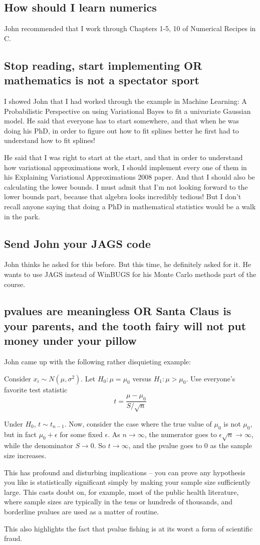 \documentclass{amsart}
\begin{document}
\subsection{How should I learn numerics}
John recommended that I work through Chapters 1-5, 10 of Numerical Recipes
in C.

\subsection{Stop reading, start implementing OR mathematics is not a spectator sport}
I showed John that I had worked through the example in Machine Learning: A
Probabilistic Perspective on using Variational Bayes to fit a univariate
Gaussian model. He said that everyone has to start somewhere, and that when
he was doing his PhD, in order to figure out how to fit splines better he first
had to understand how to fit splines!

He said that I was right to start at the start, and that in order to understand
how variational approximations work, I should implement every one of them in
his Explaining Variational Approximations 2008 paper. And that I should also
be calculating the lower bounds. I must admit that I'm not looking forward to
the lower bounds part, because that algebra looks incredibly tedious! But I don't
recall anyone saying that doing a PhD in mathematical statistics would be a
walk in the park.

\subsection{Send John your JAGS code}
John thinks he asked for this before. But this time, he definitely asked for it.
He wants to use JAGS instead of WinBUGS for his Monte Carlo methods part of the
course.

\subsection{pvalues are meaningless OR Santa Claus is your parents, and the tooth fairy will not put money under your pillow}
John came up with the following rather disquieting example:

Consider $x_i \sim N(\mu, \sigma^2)$. Let $H_0: \mu = \mu_0$ versus
$H_1: \mu > \mu_0$. Use everyone's favorite test statistic
\[
t = \frac{\mu - \mu_0}{S/\sqrt{n}}
\]

Under $H_0$, $t \sim t_{n-1}$. Now, consider the case where the true value of 
$\mu_0$ is not $\mu_0$, but in fact $\mu_0 + \epsilon$ for some fixed $\epsilon$. 
As $n \to \infty$, the numerator goes to $\epsilon \sqrt{n} \to \infty$, while the
denominator $S \to 0$. So $t \to \infty$, and the pvalue goes to $0$ as the sample 
size increases.

This has profound and disturbing implications -- you can prove any hypothesis you 
like is statistically significant simply by making your sample size sufficiently 
large. This casts doubt on, for example, most of the public health literature, 
where sample sizes are typically in the tens or hundreds of thousands, and 
borderline pvalues are used as a matter of routine.

This also highlights the fact that pvalue fishing is at its worst a form of 
scientific fraud.
\end{document}
